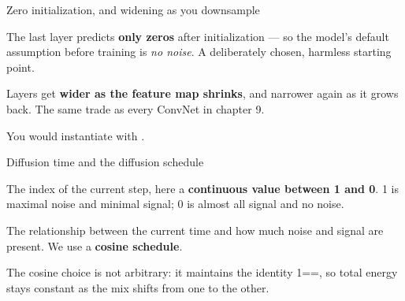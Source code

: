 \documentclass[aspectratio=169,11pt,t]{beamer}
\begin{document}
\begin{frame}[shrink=25]{Zero initialization, and widening as you downsample}
\begin{minipage}[t]{0.494\textwidth}
\begin{icardaccent}
The last layer predicts \textbf{only zeros} after initialization --- so the model's default assumption before training is \textit{no noise}. A deliberately chosen, harmless starting point.
\end{icardaccent}
\end{minipage}%
\hfill
\begin{minipage}[t]{0.494\textwidth}
\begin{icardaccent}
Layers get \textbf{wider as the feature map shrinks}, and narrower again as it grows back. The same trade as every ConvNet in chapter 9.
\end{icardaccent}
\end{minipage}%
{\fontsize{9.4}{12.6}\selectfont\color{fg2}You would instantiate with .\par}\vskip 4pt
\end{frame}

\begin{frame}[shrink=25]{Diffusion time and the diffusion schedule}
\begin{minipage}[t]{0.494\textwidth}
\begin{icardaccent}
The index of the current step, here a \textbf{continuous value between 1 and 0}. 1 is maximal noise and minimal signal; 0 is almost all signal and no noise.
\end{icardaccent}
\end{minipage}%
\hfill
\begin{minipage}[t]{0.494\textwidth}
\begin{icardaccent}
The relationship between the current time and how much noise and signal are present. We use a \textbf{cosine schedule}.
\end{icardaccent}
\end{minipage}%
{\fontsize{9.4}{12.6}\selectfont\color{fg2}The cosine choice is not arbitrary: it maintains the identity  1==, so total energy stays constant as the mix shifts from one to the other.\par}\vskip 4pt
\end{frame}
\end{document}

